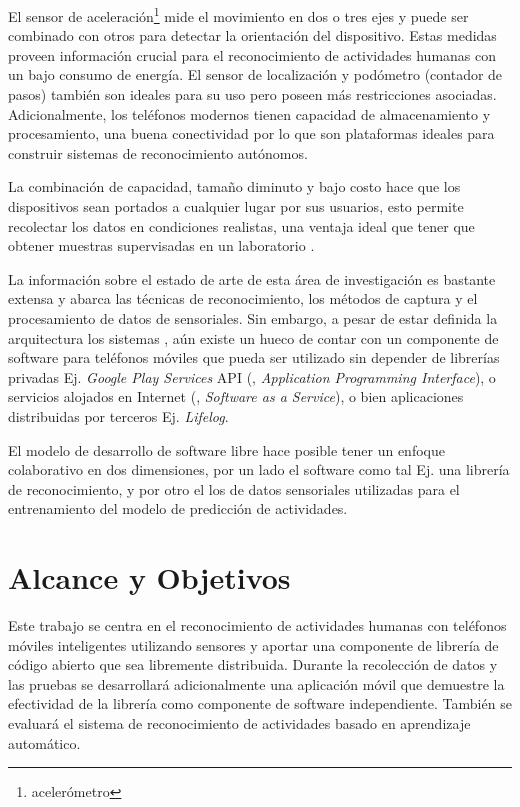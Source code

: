 El sensor de aceleración\footnote{acelerómetro} mide el movimiento
en dos o tres ejes y puede ser combinado con otros para detectar la
orientación del dispositivo. Estas medidas proveen información crucial
para el reconocimiento de actividades humanas con un bajo consumo
de energía. El sensor de localización y podómetro (contador de pasos)
también son ideales para su uso pero poseen más restricciones asociadas.
Adicionalmente, los teléfonos modernos tienen capacidad de almacenamiento
y procesamiento, una buena conectividad por lo que son plataformas
ideales para construir sistemas de reconocimiento autónomos.

La combinación de capacidad, tamaño diminuto y bajo costo hace que
los dispositivos sean portados a cualquier lugar por sus usuarios,
esto permite recolectar los datos en condiciones realistas, una ventaja
ideal que tener que obtener muestras supervisadas en un laboratorio
\cite{Bao2004}. 

La información sobre el estado de arte de esta área de investigación
es bastante extensa y abarca las técnicas de reconocimiento, los métodos
de captura y el procesamiento de datos de sensoriales\cite{LaraLabrador2012,Kwapisz2011}.
Sin embargo, a pesar de estar definida la arquitectura los sistemas
, aún existe un hueco de contar con un componente de software
para teléfonos móviles que pueda ser utilizado sin depender de librerías
privadas Ej. \emph{Google Play Services} API \cite{Google2016l} (,
\emph{Application Programming Interface}), o servicios alojados en
Internet (, \emph{Software as a Service}), o bien aplicaciones
distribuidas por terceros Ej. \emph{Lifelog}.

El modelo de desarrollo de software libre hace posible tener un enfoque
colaborativo en dos dimensiones, por un lado el software como tal
Ej. una librería de reconocimiento, y por otro el los de datos sensoriales
utilizadas para el entrenamiento del modelo de predicción de actividades.

\section{Alcance y Objetivos}

\label{sec13:alcance-y-objetivos}

Este trabajo se centra en el reconocimiento de actividades humanas
con teléfonos móviles inteligentes utilizando sensores y aportar una
componente de librería de código abierto que sea libremente distribuida.
Durante la recolección de datos y las pruebas se desarrollará adicionalmente
una aplicación móvil que demuestre la efectividad de la librería como
componente de software independiente. También se evaluará el sistema
de reconocimiento de actividades basado en aprendizaje automático.

